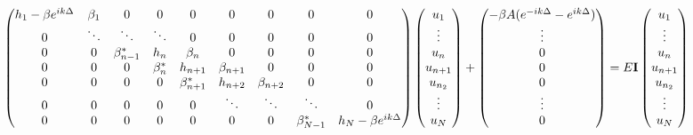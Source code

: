 \documentclass[11pt]{article}
\begin{document}
\begin{equation}
\begin{pmatrix}
h_1 -\beta e^{ik\Delta}        & \beta_1        & 0       & 0      & 0  & 0 & 0 & 0 & 0 \\
0 & \ddots & \ddots         & \ddots       & 0         & 0      & 0       & 0 & 0\\
0 & 0 & \beta_{n-1}^* & h_n          & \beta_n        & 0       & 0      & 0  & 0\\
0 & 0 & 0        & \beta_{n}^* & h_{n+1}         & \beta_{n+1} & 0      & 0  & 0 \\
0 & 0 & 0        & 0       & \beta_{n+1}^*  & h_{n+2}      & \beta_{n+2} & 0 & 0\\
0 & 0 & 0         & 0       & 0          & \ddots       & \ddots       & \ddots & 0\\
0 & 0 & 0 & 0 & 0 & 0 & 0 & \beta_{N-1}^* & h_N - \beta e^{ik\Delta}
\end{pmatrix}
\begin{pmatrix}
u_1\\
\vdots\\
u_n\\
u_{n+1}\\
u_{n_2}\\
\vdots\\
u_N
\end{pmatrix}
+ 
\begin{pmatrix}
-\beta A (e^{-ik\Delta} - e^{ik\Delta})\\
\vdots\\
0\\
0\\
0\\
\vdots\\
0
\end{pmatrix}
=
E{\bf I}
\begin{pmatrix}
u_1\\
\vdots\\
u_n\\
u_{n+1}\\
u_{n_2}\\
\vdots\\
u_N
\end{pmatrix}
\end{equation}
\end{document}
